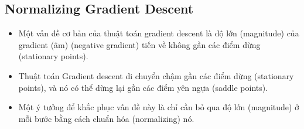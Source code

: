 \documentclass{book}
\begin{document}
\subsection{Normalizing Gradient Descent}
\begin{itemize}
    \item Một vấn đề cơ bản của thuật toán gradient descent là độ lớn (magnitude) của gradient (âm) (negative gradient) tiến về không gần các điểm dừng (stationary points).
    \item Thuật toán Gradient descent di chuyển chậm gần các điểm dừng (stationary points), và nó có thể dừng lại gần các điểm yên ngựa (saddle points).
    \item Một ý tưởng để khắc phục vấn đề này là chỉ cần bỏ qua độ lớn (magnitude) ở mỗi bước bằng cách chuẩn hóa (normalizing) nó.
\end{itemize}
\end{document}
